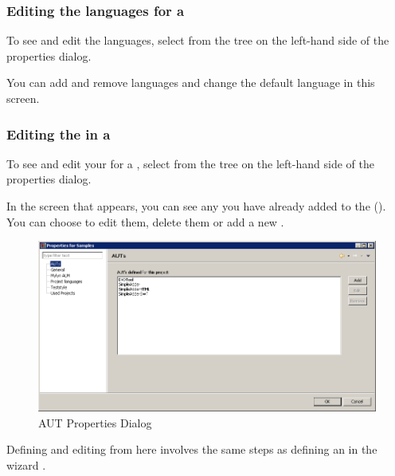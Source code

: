 \subsubsection{Editing the languages for a \gdproject}
\label{ProjPropertiesLanguage}
To see and edit the \gdproject{} languages, select  from the tree on the left-hand side of the \gdproject{} properties dialog. 

You can add and remove \gdproject{} languages and change the default language in this screen. 
 


\subsubsection{Editing the \gdauts{} in a \gdproject{}}
\label{ProjPropertiesEditAUT}

To see and edit your \gdauts{} for a \gdproject{},  select  from the tree on the left-hand side of the \gdproject{} properties dialog. 

In the screen that appears, you can see any \gdauts{} you have already added to the \gdproject{} (). You can choose to edit them, delete them or add a new \gdaut{}. 

\begin{figure}[h]
\begin{center}
\includegraphics[width=12.5cm]{Tasks/Projects/PS/autsettingsdialog}
\caption{AUT Properties Dialog}
\label{autsettingsdialog}
\end{center}
\end{figure}

Defining and editing \gdauts{} from here involves the same steps as defining  an \gdaut{} in the \gdproject{} wizard . 

